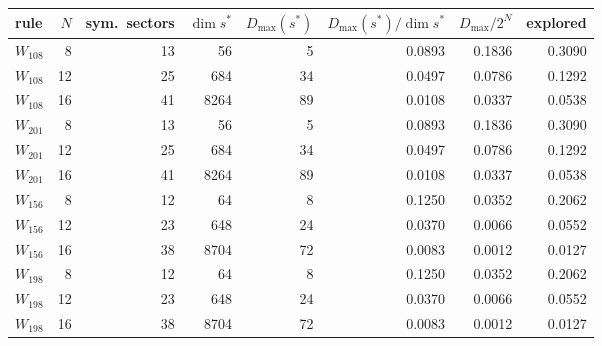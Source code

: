 \begin{tabular}{lrrrrrrr}
\toprule
rule & $N$ & sym.\ sectors & $\dim s^*$ & $D_{\max}(s^*)$ & $D_{\max}(s^*)/\dim s^*$ & $D_{\max}/2^N$ & explored \\
\midrule
$W_{108}$ & 8 & 13 & 56 & 5 & 0.0893 & 0.1836 & 0.3090 \\
$W_{108}$ & 12 & 25 & 684 & 34 & 0.0497 & 0.0786 & 0.1292 \\
$W_{108}$ & 16 & 41 & 8264 & 89 & 0.0108 & 0.0337 & 0.0538 \\
$W_{201}$ & 8 & 13 & 56 & 5 & 0.0893 & 0.1836 & 0.3090 \\
$W_{201}$ & 12 & 25 & 684 & 34 & 0.0497 & 0.0786 & 0.1292 \\
$W_{201}$ & 16 & 41 & 8264 & 89 & 0.0108 & 0.0337 & 0.0538 \\
$W_{156}$ & 8 & 12 & 64 & 8 & 0.1250 & 0.0352 & 0.2062 \\
$W_{156}$ & 12 & 23 & 648 & 24 & 0.0370 & 0.0066 & 0.0552 \\
$W_{156}$ & 16 & 38 & 8704 & 72 & 0.0083 & 0.0012 & 0.0127 \\
$W_{198}$ & 8 & 12 & 64 & 8 & 0.1250 & 0.0352 & 0.2062 \\
$W_{198}$ & 12 & 23 & 648 & 24 & 0.0370 & 0.0066 & 0.0552 \\
$W_{198}$ & 16 & 38 & 8704 & 72 & 0.0083 & 0.0012 & 0.0127 \\
\bottomrule
\end{tabular}
